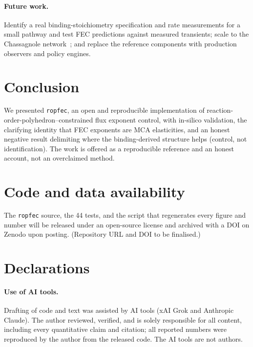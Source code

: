 \documentclass[11pt]{article}
\begin{document}
\paragraph{Future work.} Identify a real binding-stoichiometry specification and
rate measurements for a small pathway and test FEC predictions against measured
transients; scale to the Chassagnole network~\citep{chassagnole2002}; and replace
the reference components with production observers and policy engines.

\section{Conclusion}

We presented \texttt{ropfec}, an open and reproducible implementation of
reaction-order-polyhedron--constrained flux exponent control, with in-silico
validation, the clarifying identity that FEC exponents are MCA elasticities, and
an honest negative result delimiting where the binding-derived structure helps
(control, not identification). The work is offered as a reproducible reference and
an honest account, not an overclaimed method.

\section*{Code and data availability}

The \texttt{ropfec} source, the 44 tests, and the script that regenerates every
figure and number will be released under an open-source license and archived with
a DOI on Zenodo upon posting. (Repository URL and DOI to be finalised.)

\section*{Declarations}

\paragraph{Use of AI tools.} Drafting of code and text was assisted by AI tools
(xAI Grok and Anthropic Claude). The author reviewed, verified, and is solely
responsible for all content, including every quantitative claim and citation; all
reported numbers were reproduced by the author from the released code. The AI
tools are not authors.
\end{document}
